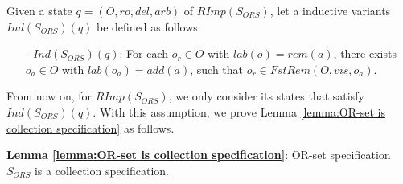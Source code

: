 Given a state $q = (O,\mathit{ro},\mathit{del},\mathit{arb})$ of $\mathit{RImp}( S_{\mathit{ORS}} )$, let a inductive variants $\mathit{Ind}(S_{\mathit{ORS}})(q)$ be defined as follows:

\begin{itemize}
\setlength{\itemsep}{0.5pt}
\item[-] $\mathit{Ind}(S_{\mathit{ORS}})(q)$: For each $o_r \in O$ with $\mathit{lab}(o) = \mathit{rem}(a)$, there exists $o_a \in O$ with $\mathit{lab}(o_a) = \mathit{add}(a)$, such that $o_r \in \mathit{FstRem}(O,\mathit{vis},o_a)$.
\end{itemize}

From now on, for $\mathit{RImp}( S_{\mathit{ORS}} )$, we only consider its states that satisfy $\mathit{Ind}(S_{\mathit{ORS}})(q)$. With this assumption, we prove Lemma \ref{lemma:OR-set is collection specification} as follows.

{\noindent \bf Lemma \ref{lemma:OR-set is collection specification}}: OR-set specification $S_{\mathit{ORS}}$ is a collection specification.

